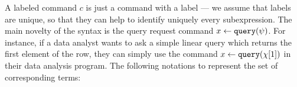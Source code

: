 % 
%
 A labeled command $c$ is just a command with a label --- we assume that labels are unique, so that they can help to identify uniquely every subexpression. 
 The main novelty of the syntax is the query request command $\mathrel{ x \leftarrow {\tt query}(\psi) }$. 
 For instance, if a data analyst wants to ask a simple linear query which returns the first element of the row, 
 they can simply use the command $ \mathrel{ x \leftarrow {\tt query}(\chi[1]) }$ in their data analysis program.
%
The following notations to represent the set of corresponding terms:
